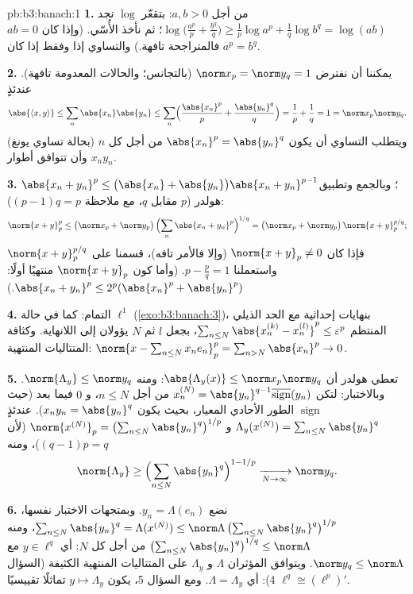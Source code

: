 \begin{solution}{pb:b3:banach:1}
\textbf{1.} من أجل $a, b > 0$: بتقعّر $\log$ نجد $\log\bigl(\tfrac{a^p}p + \tfrac{b^q}q\bigr) \geq \tfrac1p\log
a^p + \tfrac1q\log b^q = \log(ab)$؛ ثم
نأخذ الأُسّي. (وإذا كان $ab = 0$ فالمتراجحة تافهة.) والتساوي
إذا وفقط إذا كان $a^p = b^q$.

\textbf{2.} يمكننا أن نفترض $\norm x_p = \norm y_q = 1$ (بالتجانس؛ والحالات
المعدومة تافهة). عندئذٍ
\[
\abs{\langle x, y\rangle} \leq \sum_n\abs{x_n}\abs{y_n}
\leq \sum_n\Bigl(\frac{\abs{x_n}^p}p +
\frac{\abs{y_n}^q}q\Bigr) = \frac1p + \frac1q = 1 =
\norm x_p\norm y_q .
\]
ويتطلب التساوي أن يكون $\abs{x_n}^p = \abs{y_n}^q$ من أجل كل $n$ (بحالة تساوي
يونغ) وأن تتوافق أطوار $x_ny_n$.

\textbf{3.} $\abs{x_n + y_n}^p \leq \bigl(\abs{x_n} +
\abs{y_n}\bigr)\abs{x_n + y_n}^{p-1}$؛ وبالجمع وتطبيق هولدر ($p$ مقابل $q$، مع
ملاحظة $(p - 1)q = p$):
\[
\norm{x + y}_p^p \leq \bigl(\norm x_p + \norm
y_p\bigr)\,\Bigl(\sum_n\abs{x_n + y_n}^{p}\Bigr)^{1/q}
= \bigl(\norm x_p + \norm y_p\bigr)\,\norm{x+y}_p^{p/q};
\]
فإذا كان $\norm{x + y}_p \neq 0$ (وإلا فالأمر تافه)، قسمنا على $\norm{x+y}_p^{p/q}$
واستعملنا $p - \frac pq = 1$. (وأما كون $\norm{x+y}_p$ منتهيًا أولًا:
$\abs{x_n+y_n}^p \leq
2^p(\abs{x_n}^p + \abs{y_n}^p)$.)

\textbf{4.} التمام: كما في حالة $\ell^1$ (\cref{exo:b3:banach:3})، بنهايات
إحداثية مع الحد الذيلي المنتظم $\sum_{n\leq N}\abs{x^{(k)}_n - x^{(l)}_n}^p
\leq \varepsilon^p$، بجعل $l$ ثم $N$ يؤولان
إلى اللانهاية. وكثافة المتتاليات المنتهية: $\norm{x - \sum_{n\leq
N}x_ne_n}_p^p = \sum_{n > N}\abs{x_n}^p \to 0$.

\textbf{5.} تعطي هولدر أن $\abs{\Lambda_y(x)} \leq \norm
x_p\norm y_q$: ومنه $\norm{\Lambda_y} \leq \norm y_q$. وبالاختبار:
لتكن
$x^{(N)}_n = \abs{y_n}^{q-1}\overline{\operatorname{sign}}(y_n)$
من أجل $n \leq N$، و $0$ فيما بعد (حيث $\operatorname{sign}$ الطور الأحادي
المعيار، بحيث يكون $x_ny_n = \abs{y_n}^q$). عندئذٍ $\Lambda_y(x^{(N)}) = \sum_{n\leq N}\abs{y_n}^q$ و $\norm{x^{(N)}}_p = \bigl(\sum_{n\leq
N}\abs{y_n}^{q}\bigr)^{1/p}$ (لأن
$(q-1)p = q$)، ومنه
\[
\norm{\Lambda_y} \geq \Bigl(\sum_{n\leq
N}\abs{y_n}^q\Bigr)^{1 - 1/p} \xrightarrow[N\to\infty]{}
\norm y_q .
\]

\textbf{6.} نضع $y_n = \Lambda(e_n)$. وبمتجهات الاختبار نفسها، $\sum_{n \leq N}\abs{y_n}^q = \Lambda(x^{(N)}) \leq
\norm\Lambda\,\bigl(\sum_{n\leq N}\abs{y_n}^q\bigr)^{1/p}$،
ومنه $\bigl(\sum_{n\leq N}\abs{y_n}^q\bigr)^{1/q} \leq
\norm\Lambda$ من أجل كل $N$: أي $y \in \ell^q$ مع $\norm y_q \leq
\norm\Lambda$.
ويتوافق المؤثران $\Lambda$ و $\Lambda_y$ على المتتاليات
المنتهية الكثيفة (السؤال 4): أي $\Lambda =
\Lambda_y$. ومع السؤال 5، يكون
$y \mapsto \Lambda_y$ تماثلًا تقييسيًا $\ell^q \cong (\ell^p)'$.


\end{solution}

